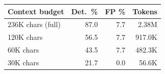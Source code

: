 \begin{tabular}{lrrr}
\toprule
Context budget & Det.\ \% & FP \% & Tokens \\
\midrule
236K chars (full) & 87.0 & 7.7 & 2.38M \\
120K chars & 56.5 & 7.7 & 917.0K \\
60K chars & 43.5 & 7.7 & 482.3K \\
30K chars & 21.7 & 0.0 & 56.6K \\
\bottomrule
\end{tabular}
